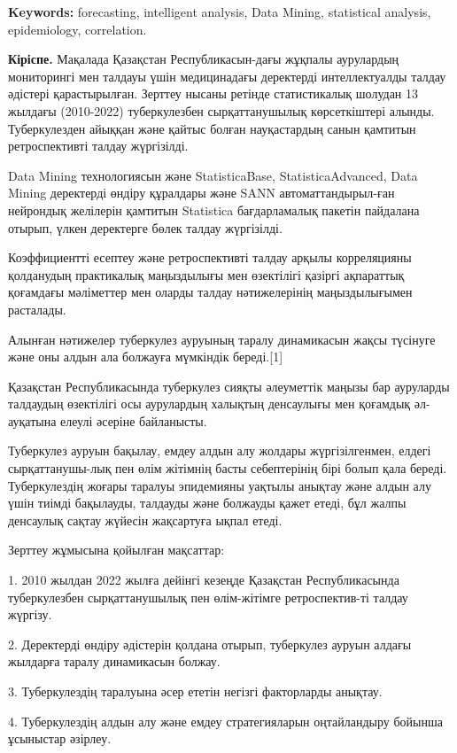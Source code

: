 {\bfseries Keywords:} forecasting, intelligent analysis, Data Mining,
statistical analysis, epidemiology, correlation.
\begin{multicols}{2}

{\bfseries Кіріспе.} Мақалада Қазақстан Республикасын-дағы жұқпалы
аурулардың мониторингі мен талдауы үшін медицинадағы деректерді
интеллектуалды талдау әдістері қарастырылған. Зерттеу нысаны ретінде
статистикалық шолудан 13 жылдағы (2010-2022) туберкулезбен
сырқаттанушылық көрсеткіштері алынды. Туберкулезден айыққан және қайтыс
болған науқастардың санын қамтитын ретроспективті талдау жүргізілді.

Data Mining технологиясын және StatisticaBase, StatisticaAdvanced, Data
Mining деректерді өндіру құралдары және SANN автоматтандырыл-ған
нейрондық желілерін қамтитын Statistica бағдарламалық пакетін пайдалана
отырып, үлкен деректерге бөлек талдау жүргізілді.

Коэффициентті есептеу және ретроспективті талдау арқылы корреляцияны
қолданудың практикалық маңыздылығы мен өзектілігі қазіргі ақпараттық
қоғамдағы мәліметтер мен оларды талдау нәтижелерінің маңыздылығымен
расталады.

Алынған нәтижелер туберкулез ауруының таралу динамикасын жақсы түсінуге
және оны алдын ала болжауға мүмкіндік береді.{[}1{]}

Қазақстан Республикасында туберкулез сияқты әлеуметтік маңызы бар
ауруларды талдаудың өзектілігі осы аурулардың халықтың денсаулығы мен
қоғамдық әл-ауқатына елеулі әсеріне байланысты.

Туберкулез ауруын бақылау, емдеу алдын алу жолдары жүргізілгенмен,
елдегі сырқаттанушы-лық пен өлім жітімнің басты себептерінің бірі болып
қала береді. Туберкулездің жоғары таралуы эпидемияны уақтылы анықтау
және алдын алу үшін тиімді бақылауды, талдауды және болжауды қажет
етеді, бұл жалпы денсаулық сақтау жүйесін жақсартуға ықпал етеді.

Зерттеу жұмысына қойылған мақсаттар:

1. 2010 жылдан 2022 жылға дейінгі кезеңде Қазақстан Республикасында
туберкулезбен сырқаттанушылық пен өлім-жітімге ретроспектив-ті талдау
жүргізу.

2. Деректерді өндіру әдістерін қолдана отырып, туберкулез ауруын алдағы
жылдарға таралу динамикасын болжау.

3. Туберкулездің таралуына әсер ететін негізгі факторларды анықтау.

4. Туберкулездің алдын алу және емдеу стратегияларын оңтайландыру
бойынша ұсыныстар әзірлеу.


\end{multicols}
